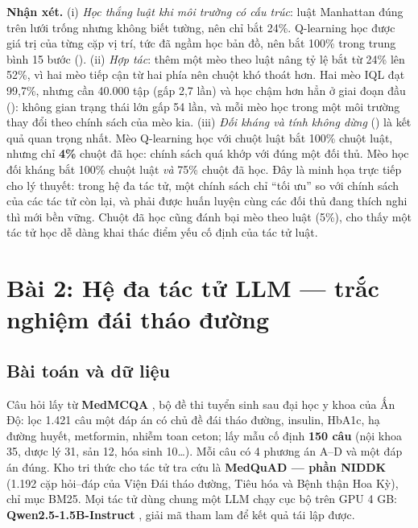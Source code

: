 

\textbf{Nhận xét.} (i) \emph{Học thắng luật khi môi trường có cấu trúc}: luật Manhattan đúng trên lưới trống nhưng không biết tường, nên chỉ bắt 24\%. Q-learning học được giá trị của từng cặp vị trí, tức đã ngầm học bản đồ, nên bắt 100\% trong trung bình 15 bước (). (ii) \emph{Hợp tác}: thêm một mèo theo luật nâng tỷ lệ bắt từ 24\% lên 52\%, vì hai mèo tiếp cận từ hai phía nên chuột khó thoát hơn. Hai mèo IQL đạt 99,7\%, nhưng cần 40.000 tập (gấp 2,7 lần) và học chậm hơn hẳn ở giai đoạn đầu (): không gian trạng thái lớn gấp 54 lần, và mỗi mèo học trong một môi trường thay đổi theo chính sách của mèo kia. (iii) \emph{Đối kháng và tính không dừng} () là kết quả quan trọng nhất. Mèo Q-learning học với chuột luật bắt 100\% chuột luật, nhưng chỉ \textbf{4\%} chuột đã học: chính sách quá khớp với đúng một đối thủ. Mèo học đối kháng bắt 100\% chuột luật \emph{và} 75\% chuột đã học. Đây là minh họa trực tiếp cho lý thuyết: trong hệ đa tác tử, một chính sách chỉ ``tối ưu'' so với chính sách của các tác tử còn lại, và phải được huấn luyện cùng các đối thủ đang thích nghi thì mới bền vững. Chuột đã học cũng đánh bại mèo theo luật (5\%), cho thấy một tác tử học dễ dàng khai thác điểm yếu cố định của tác tử luật.

\section{Bài 2: Hệ đa tác tử LLM — trắc nghiệm đái tháo đường}
\label{sec:ch7-llm}

\subsection{Bài toán và dữ liệu}

Câu hỏi lấy từ \textbf{MedMCQA} \cite{pal2022medmcqa}, bộ đề thi tuyển sinh sau đại học y khoa của Ấn Độ: lọc 1.421 câu một đáp án có chủ đề đái tháo đường, insulin, HbA1c, hạ đường huyết, metformin, nhiễm toan ceton; lấy mẫu cố định \textbf{150 câu} (nội khoa 35, dược lý 31, sản 12, hóa sinh 10\ldots). Mỗi câu có 4 phương án A–D và một đáp án đúng. Kho tri thức cho tác tử tra cứu là \textbf{MedQuAD — phần NIDDK} \cite{benabacha2019} (1.192 cặp hỏi–đáp của Viện Đái tháo đường, Tiêu hóa và Bệnh thận Hoa Kỳ), chỉ mục BM25. Mọi tác tử dùng chung một LLM chạy cục bộ trên GPU 4 GB: \textbf{Qwen2.5-1.5B-Instruct} \cite{qwen2024}, giải mã tham lam để kết quả tái lập được.

